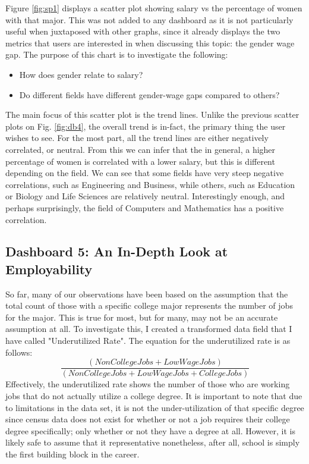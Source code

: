 \documentclass[sigchi]{acmart}
\begin{document}
Figure \ref{fig:sp1} displays a scatter plot showing salary vs the percentage of women with that major. This was not added to any dashboard as it is not particularly useful when juxtaposed with other graphs, since it already displays the two metrics that users are interested in when discussing this topic: the gender wage gap. The purpose of this chart is to investigate the following:
\begin{itemize}
\item{How does gender relate to salary?}
\item{Do different fields have different gender-wage gaps compared to others?}
\end{itemize}
The main focus of this scatter plot is the trend lines. Unlike the previous scatter plots on Fig. \ref{fig:db4}, the overall trend is in-fact, the primary thing the user wishes to see. For the most part, all the trend lines are either negatively correlated, or neutral. From this we can infer that the in general, a higher percentage of women is correlated with a lower salary, but this is different depending on the field. We can see that some fields have very steep negative correlations, such as Engineering and Business, while others, such as Education or Biology and Life Sciences are relatively neutral. Interestingly enough, and perhaps surprisingly, the field of Computers and Mathematics has a positive correlation.


\subsection{Dashboard 5: An In-Depth Look at Employability}
\label{sec:db5}

So far, many of our observations have been based on the assumption that the total count of those with a specific college major represents the number of jobs for the major. This is true for most, but for many, may not be an accurate assumption at all. To investigate this, I created a transformed data field that I have called "Underutilized Rate". The equation for the underutilized rate is as follows:
\begin{displaymath}
  \frac{(NonCollegeJobs + LowWageJobs)}{(NonCollegeJobs + LowWageJobs + CollegeJobs)}
\end{displaymath}
Effectively, the underutilized rate shows the number of those who are working jobs that do not actually utilize a college degree. It is important to note that due to limitations in the data set, it is not the under-utilization of that specific degree since census data does not exist for whether or not a job requires their college degree specifically; only whether or not they have a degree at all. However, it is likely safe to assume that it representative nonetheless, after all, school is simply the first building block in the career.
\end{document}
